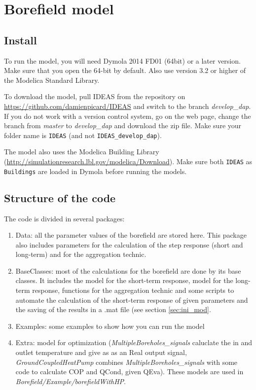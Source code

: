 \documentclass[a4paper,oneside,11pt]{report}
\begin{document}
\chapter*{Borefield model}

\section{Install}
To run the model, you will need Dymola 2014 FD01 (64bit) or a later version. Make sure that you open the 64-bit by default. Also use version 3.2 or higher of the Modelica Standard Library.


To download the model, pull IDEAS from the repository on \url{https://github.com/damienpicard/IDEAS} and switch to the branch \textit{develop\_dap}. If you do not work with a version control system, go on the web page, change the branch from \textit{master} to \textit{develop\_dap} and download the zip file. Make sure your folder name is {\tt IDEAS} (and not {\tt IDEAS\_develop\_dap}). 

The model also uses the Modelica Building Library (\url{http://simulationresearch.lbl.gov/modelica/Download}). Make sure both {\tt IDEAS} as {\tt Buildings} are loaded in Dymola before running the models.

\section{Structure of the code}
The code is divided in several packages:
\begin{enumerate}
\item Data: all the parameter values of the borefield are stored here. This package also includes parameters for the calculation of the step response (short and long-term) and for the aggregation technic.
\item BaseClasses: most of the calculations for the borefield are done by its base classes. It includes the model for the short-term response, model for the long-term response, functions for the aggregation technic and some scripts to automate the calculation of the short-term response of given parameters and the saving of the results in a .mat file (see section \ref{sec:ini_mod}.
\item Examples: some examples to show how you can run the model
\item Extra: model for optimization (\textit{MultipleBoreholes\_signals} caluclate the in and outlet temperature and give as as an Real output signal, \textit{GroundCoupledHeatPump} combines \textit{MultipleBoreholes\_signals} with some code to calculate COP and QCond, given QEva). These models are used in \textit{Borefield/Example/borefieldWithHP}.
\end{enumerate}
\end{document}
